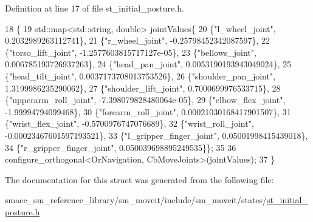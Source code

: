 Definition at line 17 of file st\+\_\+initial\+\_\+posture.\+h.


\begin{DoxyCode}
18     \{
19         std::map<std::string, double> jointValues\{
20             \{\textcolor{stringliteral}{"l\_wheel\_joint"}, 0.2032989263112741\},
21             \{\textcolor{stringliteral}{"r\_wheel\_joint"}, -0.25798452342087597\},
22             \{\textcolor{stringliteral}{"torso\_lift\_joint"}, -1.2577603815717127e-05\},
23             \{\textcolor{stringliteral}{"bellows\_joint"}, 0.006785193726937263\},
24             \{\textcolor{stringliteral}{"head\_pan\_joint"}, 0.0053190193943049024\},
25             \{\textcolor{stringliteral}{"head\_tilt\_joint"}, 0.0037173708013753526\},
26             \{\textcolor{stringliteral}{"shoulder\_pan\_joint"}, 1.3199986235290062\},
27             \{\textcolor{stringliteral}{"shoulder\_lift\_joint"}, 0.7000699976533715\},
28             \{\textcolor{stringliteral}{"upperarm\_roll\_joint"}, -7.398079828480064e-05\},
29             \{\textcolor{stringliteral}{"elbow\_flex\_joint"}, -1.99994794099468\},
30             \{\textcolor{stringliteral}{"forearm\_roll\_joint"}, 0.00021030168417901507\},
31             \{\textcolor{stringliteral}{"wrist\_flex\_joint"}, -0.5700976747076689\},
32             \{\textcolor{stringliteral}{"wrist\_roll\_joint"}, -0.00023467601597193521\},
33             \{\textcolor{stringliteral}{"l\_gripper\_finger\_joint"}, 0.05001998415439018\},
34             \{\textcolor{stringliteral}{"r\_gripper\_finger\_joint"}, 0.050039698895249535\}\};
35 
36         configure\_orthogonal<OrNavigation, CbMoveJoints>(jointValues);
37     \}
\end{DoxyCode}


The documentation for this struct was generated from the following file\+:\begin{DoxyCompactItemize}
\item 
smacc\+\_\+sm\+\_\+reference\+\_\+library/sm\+\_\+moveit/include/sm\+\_\+moveit/states/\hyperlink{st__initial__posture_8h}{st\+\_\+initial\+\_\+posture.\+h}\end{DoxyCompactItemize}
